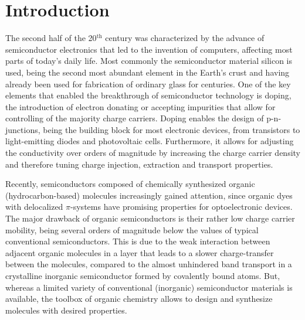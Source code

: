 \chapter{Introduction}
%
The second half of the 20$^\text{th}$ century was characterized by the advance of semiconductor electronics that led to the invention of computers, affecting most parts of today's daily life.
Most commonly the semiconductor material silicon is used, being the second most abundant element in the Earth's crust and having already been used for fabrication of ordinary glass for centuries.
One of the key elements that enabled the breakthrough of semiconductor technology is doping, \ie the introduction of electron donating or accepting impurities that allow for controlling of the majority charge carriers. Doping enables the design of p-n-junctions, being the building block for most electronic devices, from transistors to light-emitting diodes and photovoltaic cells. Furthermore, it allows for adjusting the conductivity over orders of magnitude by increasing the charge carrier density and therefore tuning charge injection, extraction and transport properties.

Recently, semiconductors composed of chemically synthesized organic (\ie hydrocarbon-based) molecules increasingly gained attention, since organic dyes with delocalized $\pi$-systems have promising properties for optoelectronic devices.
The major drawback of organic semiconductors is their rather low charge carrier mobility, being several orders of magnitude below the values of typical conventional semiconductors. This is due to the weak interaction between adjacent organic molecules in a layer that leads to a slower charge-transfer between the molecules, compared to the almost unhindered band transport in a crystalline inorganic semiconductor formed by covalently bound atoms.
%
But, whereas a limited variety of conventional (inorganic) semiconductor materials is available, the toolbox of organic chemistry allows to design and synthesize molecules with desired properties.

